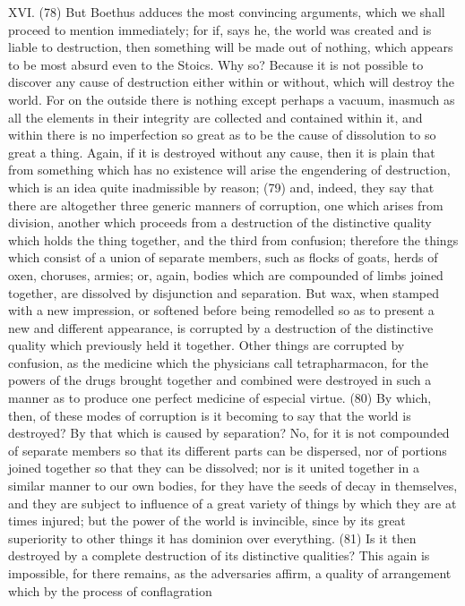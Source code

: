 XVI. (78) But Boethus adduces the most convincing arguments, which we shall proceed to mention
immediately; for if, says he, the world was created and is liable to destruction, then something will
be made out of nothing, which appears to be most absurd even to the Stoics. Why so? Because it
is not possible to discover any cause of destruction either within or without, which will destroy the
world. For on the outside there is nothing except perhaps a vacuum, inasmuch as all the elements
in their integrity are collected and contained within it, and within there is no imperfection so great as
to be the cause of dissolution to so great a thing. Again, if it is destroyed without any cause, then it
is plain that from something which has no existence will arise the engendering of destruction, which
is an idea quite inadmissible by reason; (79) and, indeed, they say that there are altogether three
generic manners of corruption, one which arises from division, another which proceeds from a
destruction of the distinctive quality which holds the thing together, and the third from confusion;
therefore the things which consist of a union of separate members, such as flocks of goats, herds
of oxen, choruses, armies; or, again, bodies which are compounded of limbs joined together, are
dissolved by disjunction and separation. But wax, when stamped with a new impression, or
softened before being remodelled so as to present a new and different appearance, is corrupted
by a destruction of the distinctive quality which previously held it together. Other things are
corrupted by confusion, as the medicine which the physicians call tetrapharmacon, for the powers
of the drugs brought together and combined were destroyed in such a manner as to produce one
perfect medicine of especial virtue. (80) By which, then, of these modes of corruption is it
becoming to say that the world is destroyed? By that which is caused by separation? No, for it is
not compounded of separate members so that its different parts can be dispersed, nor of portions
joined together so that they can be dissolved; nor is it united together in a similar manner to our
own bodies, for they have the seeds of decay in themselves, and they are subject to influence of a
great variety of things by which they are at times injured; but the power of the world is invincible,
since by its great superiority to other things it has dominion over everything. (81) Is it then
destroyed by a complete destruction of its distinctive qualities? This again is impossible, for there
remains, as the adversaries affirm, a quality of arrangement which by the process of conflagration
